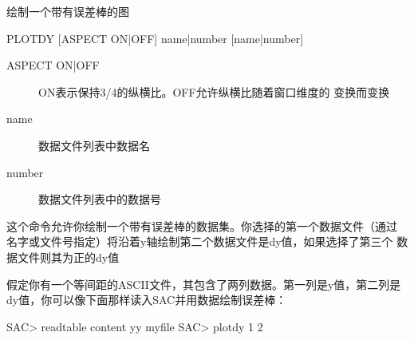 \label{cmd:plotdy}

绘制一个带有误差棒的图

\begin{SACSTX}
PLOTDY [ASPECT ON|OFF] name|number [name|number]
\end{SACSTX}

\begin{description}
\item [ASPECT ON|OFF] ON表示保持3/4的纵横比。OFF允许纵横比随着窗口维度的
    变换而变换
\item [name] 数据文件列表中数据名
\item [number] 数据文件列表中的数据号
\end{description}

这个命令允许你绘制一个带有误差棒的数据集。你选择的第一个数据文件（通过
名字或文件号指定）将沿着y轴绘制第二个数据文件是dy值，如果选择了第三个
数据文件则其为正的dy值

假定你有一个等间距的ASCII文件，其包含了两列数据。第一列是y值，第二列是
dy值，你可以像下面那样读入SAC并用数据绘制误差棒：
\begin{SACCode}
SAC> readtable content yy myfile
SAC> plotdy 1 2
\end{SACCode}
